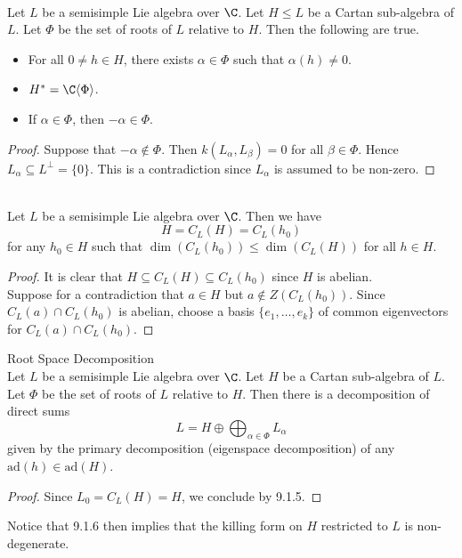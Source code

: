 \documentclass[a4paper]{article}
\begin{document}
\begin{lmm}{}{} \\Let $L$ be a semisimple Lie algebra over $\C$. Let $H\leq L$ be a Cartan sub-algebra of $L$. Let $\Phi$ be the set of roots of $L$ relative to $H$. Then the following are true. 
\begin{itemize}
\item For all $0\neq h\in H$, there exists $\alpha\in\Phi$ such that $\alpha(h)\neq 0$. 
\item $H^\ast=\C\langle\Phi\rangle$. 
\item If $\alpha\in\Phi$, then $-\alpha\in\Phi$. 
\end{itemize} 
\begin{proof}
Suppose that $-\alpha\notin\Phi$. Then $k(L_\alpha,L_\beta)=0$ for all $\beta\in\Phi$. Hence $L_\alpha\subseteq L^\perp=\{0\}$. This is a contradiction since $L_\alpha$ is assumed to be non-zero. 
\end{proof}
\end{lmm}

\begin{prp}{}{} \\Let $L$ be a semisimple Lie algebra over $\C$. Then we have $$H=C_L(H)=C_L(h_0)$$ for any $h_0\in H$ such that $\dim(C_L(h_0))\leq\dim(C_L(H))$ for all $h\in H$. 
\begin{proof}
It is clear that $H\subseteq C_L(H)\subseteq C_L(h_0)$ since $H$ is abelian. \\

Suppose for a contradiction that $a\in H$ but $a\notin Z(C_L(h_0))$. Since $C_L(a)\cap C_L(h_0)$ is abelian, choose a basis $\{e_1,\dots,e_k\}$ of common eigenvectors for $C_L(a)\cap C_L(h_0)$. 
\end{proof}
\end{prp}

\begin{thm}{Root Space Decomposition}{} \\Let $L$ be a semisimple Lie algebra over $\C$. Let $H$ be a Cartan sub-algebra of $L$. Let $\Phi$ be the set of roots of $L$ relative to $H$. Then there is a decomposition of direct sums $$L=H\oplus\bigoplus_{\alpha\in\Phi}L_\alpha$$ given by the primary decomposition (eigenspace decomposition) of any $\text{ad}(h)\in\text{ad}(H)$. 
\begin{proof}
Since $L_0=C_L(H)=H$, we conclude by 9.1.5. 
\end{proof}
\end{thm}

Notice that 9.1.6 then implies that the killing form on $H$ restricted to $L$ is non-degenerate. 
\end{document}
